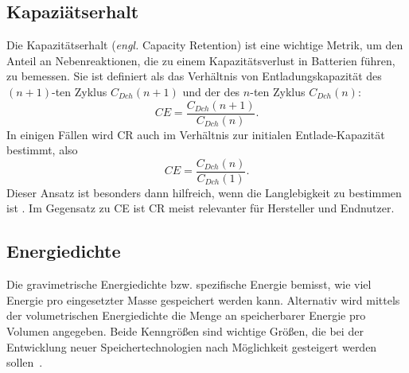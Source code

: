 \subsection{Kapaziätserhalt}
Die Kapazitätserhalt (\textit{engl.} Capacity Retention) ist eine wichtige Metrik, um den Anteil an Nebenreaktionen, die zu einem Kapazitätsverlust in Batterien führen, zu bemessen. Sie ist definiert als das Verhältnis von Entladungskapazität des $(n+1)$-ten Zyklus $C_{Dch}(n+1)$ und der des $n$-ten Zyklus $C_{Dch}(n)$:
\begin{equation}
    CE = \frac{C_{Dch}(n+1)}{C_{Dch}(n)}.
\end{equation}
In einigen Fällen wird CR auch im Verhältnis zur initialen Entlade-Kapazität bestimmt, also
\begin{equation}
    CE = \frac{C_{Dch}(n)}{C_{Dch}(1)}.
\end{equation}
Dieser Ansatz ist besonders dann hilfreich, wenn die Langlebigkeit zu bestimmen ist \cite{Tornheim2020}.
Im Gegensatz zu CE ist CR meist relevanter für Hersteller und Endnutzer.

\subsection{Energiedichte}
Die gravimetrische Energiedichte bzw. spezifische Energie bemisst, wie viel Energie pro eingesetzter Masse gespeichert werden kann. Alternativ wird mittels der volumetrischen Energiedichte die Menge an speicherbarer Energie pro Volumen angegeben. Beide Kenngrößen sind wichtige Größen, die bei der Entwicklung neuer Speichertechnologien nach Möglichkeit gesteigert werden sollen~\cite{Plett2015}.

